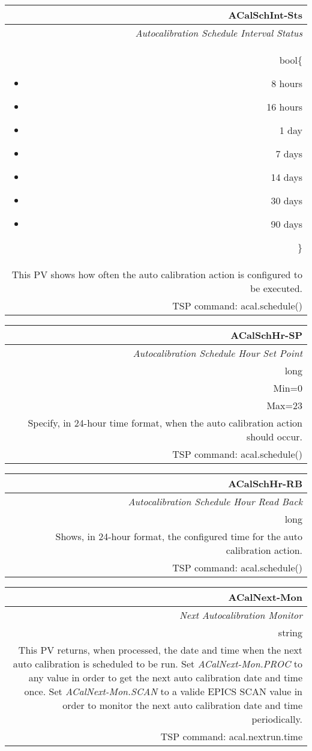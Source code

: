 \documentclass[openany]{article}
\begin{document}
		\begin{tabular}{N}
			\hline
			\bfseries ACalSchInt-Sts\label{pv:acalschint-sts} \\ \hline
			\emph{Autocalibration Schedule Interval Status} \\
			bool\{\begin{itemize}[noitemsep]
				\small
				\item[] 8 hours
				\item[] 16 hours
				\item[] 1 day
				\item[] 7 days
				\item[] 14 days
				\item[] 30 days
				\item[] 90 days
			\end{itemize}\} \\
			This PV shows how often the auto calibration action is configured to be executed. \\
			TSP command: acal.schedule()
		\end{tabular}

		\begin{tabular}{N}
			\hline
			\bfseries ACalSchHr-SP\label{pv:acalschhr-sp} \\ \hline
			\emph{Autocalibration Schedule Hour Set Point} \\
			long \\
			Min=0 \\
			Max=23 \\
			Specify, in 24-hour time format, when the auto calibration action should occur. \\
			TSP command: acal.schedule()
		\end{tabular}

		\begin{tabular}{N}
			\hline
			\bfseries ACalSchHr-RB\label{pv:acalschhr-rb} \\ \hline
			\emph{Autocalibration Schedule Hour Read Back} \\
			long \\
			Shows, in 24-hour format, the configured time for the auto calibration action. \\
			TSP command: acal.schedule()
		\end{tabular}

		\begin{tabular}{N}
			\hline
			\bfseries ACalNext-Mon\label{pv:acalnext-mon} \\ \hline
			\emph{Next Autocalibration Monitor} \\
			string \\
			This PV returns, when processed, the date and time when the next auto calibration is scheduled to be run. Set \emph{ACalNext-Mon.PROC} to any value in order to get the next auto calibration date and time once. Set \emph{ACalNext-Mon.SCAN} to a valide EPICS SCAN value in order to monitor the next auto calibration date and time periodically. \\
			TSP command: acal.nextrun.time
		\end{tabular}
\end{document}
